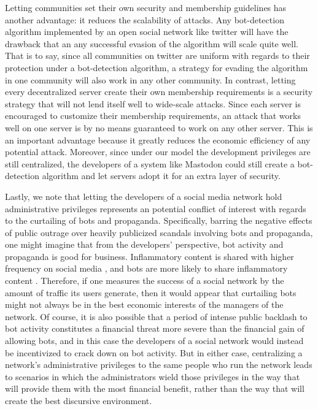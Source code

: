 \documentclass[sigconf,authordraft]{acmart}
\begin{document}
Letting communities set their own security and membership guidelines has another advantage: it reduces the scalability of attacks. Any bot-detection algorithm implemented by an open social network like twitter will have the drawback that an any successful evasion of the algorithm will scale quite well. That is to say, since all communities on twitter are uniform with regards to their protection under a bot-detection algorithm, a strategy for evading the algorithm in one community will also work in any other community. In contrast, letting every decentralized server create their own membership requirements is a security strategy that will not lend itself well to wide-scale attacks. Since each server is encouraged to customize their membership requirements, an attack that works well on one server is by no means guaranteed to work on any other server. This is an important advantage because it greatly reduces the economic efficiency of any potential attack. Moreover, since under our model the development privileges are still centralized, the developers of a system like Mastodon could still create a bot-detection algorithm and let servers adopt it for an extra layer of security.

Lastly, we note that letting the developers of a social media network hold administrative privileges represents an potential conflict of interest with regards to the curtailing of bots and propaganda. Specifically, barring the negative effects of public outrage over heavily publicized scandals involving bots and propaganda, one might imagine that from the developers' perspective, bot activity and propaganda is good for business. Inflammatory content is shared with higher frequency on social media \cite{stieglitz2013emotions}, and bots are more likely to share inflammatory content \cite{stella2018bots}. Therefore, if one measures the success of a social network by the amount of traffic its users generate, then it would appear that curtailing bots might not always be in the best economic interests of the managers of the network. Of course, it is also possible that a period of intense public backlash to bot activity constitutes a financial threat more severe than the financial gain of allowing bots, and in this case the developers of a social network would instead be incentivized to crack down on bot activity. But in either case, centralizing a network's administrative privileges to the same people who run the network leads to scenarios in which the administrators wield those privileges in the way that will provide them with the most financial benefit, rather than the way that will create the best discursive environment.
\end{document}
